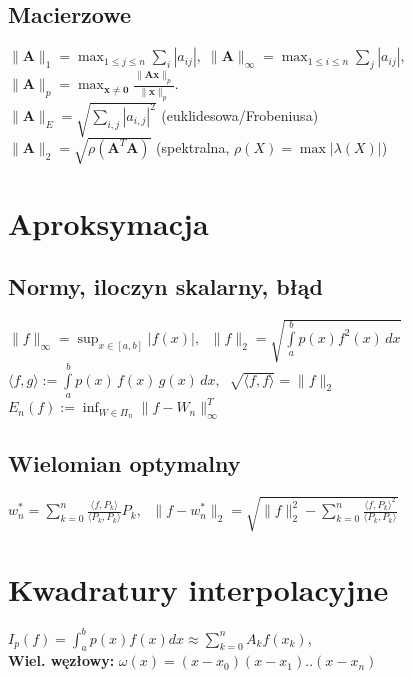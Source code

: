 \documentclass[a4paper,twocolumn]{article}
\begin{document}
\subsection{Macierzowe}
${\displaystyle \|\mathbf {A} \|_{1}=\max _{1 \leq j \leq n}\sum _{i}|a_{ij}|,\; \|\mathbf {A} \|_{\infty }=\max _{1\leq i\leq n}\sum _{j}|a_{ij}|,\;}$\\
${\displaystyle \|\mathbf {A} \|_{p}=\max _{\mathbf {x} \neq \mathbf {0} }{\tfrac {\|\mathbf {Ax} \|_{p}}{\|\mathbf {x} \|_{p}}}.}$\\
${\displaystyle \|\mathbf {A} \|_{E}=\sqrt{\sum_{i,j}|a_{i,j}|^2}}$ (euklidesowa/Frobeniusa)\\
${\displaystyle \|\mathbf {A} \|_{2}=\sqrt{\rho(\mathbf{A}^T\mathbf{A})}}$ (spektralna, $\rho(X) = \max |\lambda(X)|$)


\section{Aproksymacja}

\subsection{Normy, iloczyn skalarny, błąd}
$\|f\|_\infty = \sup_{x \in [a,b]}|f(x)|,\;$
$\|f\|_2 = \sqrt{\int\limits_a^b p(x)f^2(x)\,dx}$\\
$\langle f, g \rangle := \int\limits_a^b p(x)\,f(x)\,g(x)\,dx,\;\; \sqrt{\langle f, f \rangle} = \|f\|_2$\\
$E_n(f) := \inf_{W \in \Pi_n} \|f-W_n\|_\infty^T$

\subsection{Wielomian optymalny}

$w_n^* = \sum_{k=0}^n \frac{\langle f, P_k \rangle}{\langle P_k, P_k \rangle} P_k,\;$
$\|f-w_n^*\|_2 = \sqrt{\|f\|_2^2 - \sum_{k=0}^n \frac{{\langle f, P_k \rangle}^2}{\langle P_k, P_k \rangle}}$

\section{Kwadratury interpolacyjne}
\noindent $I_p(f) = \int_{a}^{b}p(x)f(x)dx \approx \sum_{k=0}^{n}A_kf(x_k)$, \\
\textbf{Wiel. węzłowy:} $\omega(x) = (x-x_0)(x-x_1)..(x-x_n)$
\end{document}
